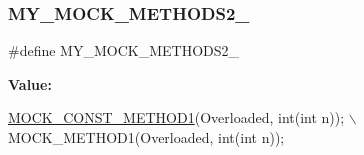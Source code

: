 \subsubsection{\texorpdfstring{M\+Y\+\_\+\+M\+O\+C\+K\+\_\+\+M\+E\+T\+H\+O\+D\+S2\+\_\+}{MY\_MOCK\_METHODS2\_}}
{\footnotesize\ttfamily \#define M\+Y\+\_\+\+M\+O\+C\+K\+\_\+\+M\+E\+T\+H\+O\+D\+S2\+\_\+}

{\bfseries Value\+:}
\begin{DoxyCode}
\hyperlink{gmock-generated-function-mockers_8h_a6f76aeb56f492cfe538e177b6aa77965}{MOCK\_CONST\_METHOD1}(Overloaded, \textcolor{keywordtype}{int}(\textcolor{keywordtype}{int} n)); \(\backslash\)
    MOCK\_METHOD1(Overloaded, \textcolor{keywordtype}{int}(\textcolor{keywordtype}{int} n));
\end{DoxyCode}
